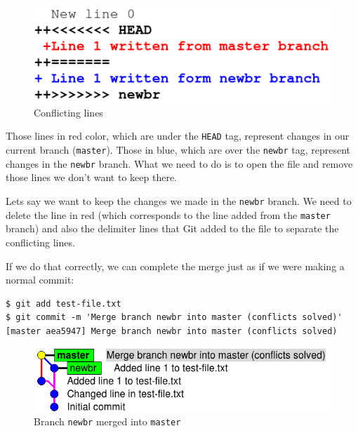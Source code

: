 \documentclass[a4paper,10pt]{article}
\newenvironment{terminal}
  {
    \vspace{+10pt}
    \begin{center}
    \begin{minipage}{0.95\textwidth}
    \begin{framed}
  }
  {
    \end{framed}
    \end{minipage}
    \end{center}
    \vspace{+10pt}
  }
\begin{document}
\begin{figure}[h]
  \begin{center}
    \includegraphics[scale=0.5]{git_example-08}
  \end{center}
  \caption{Conflicting lines}
\end{figure}

Those lines in red color, which are under the \texttt{HEAD} tag,
represent changes in our current branch (\texttt{master}). Those in
blue, which are over the \texttt{newbr} tag, represent changes in the
\texttt{newbr} branch. What we need to do is to open the file and
remove those lines we don't want to keep there.

Lets say we want to keep the changes we made in the \texttt{newbr}
branch. We need to delete the line in red (which corresponds to the
line added from the \texttt{master} branch) and also the delimiter
lines that Git added to the file to separate the conflicting lines.

If we do that correctly, we can complete the merge just as if we were
making a normal commit:

\begin{terminal}
\begin{verbatim}
$ git add test-file.txt
$ git commit -m 'Merge branch newbr into master (conflicts solved)'
[master aea5947] Merge branch newbr into master (conflicts solved)
\end{verbatim}%
\end{terminal}

\begin{figure}[h]
  \begin{center}
    \includegraphics[scale=0.5]{git_example-09}
  \end{center}
  \caption{Branch \texttt{newbr} merged into \texttt{master}}
\end{figure}
\end{document}
